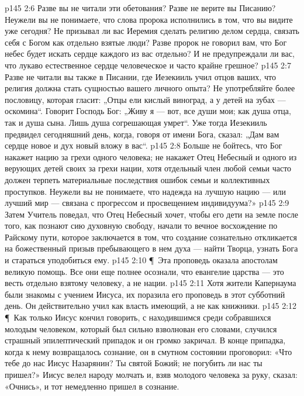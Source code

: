 \vs p145 2:6 Разве вы не читали эти обетования? Разве не верите вы Писанию? Неужели вы не понимаете, что слова пророка исполнились в том, что вы видите уже сегодня? Не призывал ли вас Иеремия сделать религию делом сердца, связать себя с Богом как отдельно взятые люди? Разве пророк не говорил вам, что Бог небес будет искать сердце каждого из вас отдельно? И не предупреждали ли вас, что лукаво естественное сердце человеческое и часто крайне грешное?
\vs p145 2:7 Разве не читали вы также в Писании, где Иезекииль учил отцов ваших, что религия должна стать сущностью вашего личного опыта? Не употребляйте более пословицу, которая гласит: „Отцы ели кислый виноград, а у детей на зубах --- оскомина“. Говорит Господь Бог: „Живу я --- вот, все души мои; как душа отца, так и душа сына. Лишь душа согрешающая умрет“. Уже тогда Иезекииль предвидел сегодняшний день, когда, говоря от имени Бога, сказал: „Дам вам сердце новое и дух новый вложу в вас“.
\vs p145 2:8 Больше не бойтесь, что Бог накажет нацию за грехи одного человека; не накажет Отец Небесный и одного из верующих детей своих за грехи нации, хотя отдельный член любой семьи часто должен терпеть материальные последствия ошибок семьи и коллективных проступков. Неужели вы не понимаете, что надежда на лучшую нацию --- или лучший мир --- связана с прогрессом и просвещением индивидуума?»
\vs p145 2:9 Затем Учитель поведал, что Отец Небесный хочет, чтобы его дети на земле после того, как познают сию духовную свободу, начали то вечное восхождение по Райскому пути, которое заключается в том, что создание сознательно откликается на божественный призыв пребывающего в нем духа --- найти Творца, узнать Бога и стараться уподобиться ему.
\vs p145 2:10 \P\ Эта проповедь оказала апостолам великую помощь. Все они еще полнее осознали, что евангелие царства --- это весть отдельно взятому человеку, а не нации.
\vs p145 2:11 Хотя жители Капернаума были знакомы с учением Иисуса, их поразила его проповедь в этот субботний день. Он действительно учил как власть имеющий, а не как книжники.
\vs p145 2:12 \P\ Как только Иисус кончил говорить, с находившимся среди собравшихся молодым человеком, который был сильно взволнован его словами, случился страшный эпилептический припадок и он громко закричал. В конце припадка, когда к нему возвращалось сознание, он в смутном состоянии проговорил: «Что тебе до нас Иисус Назарянин? Ты святой Божий; не погубить ли нас ты пришел?» Иисус велел народу молчать и, взяв молодого человека за руку, сказал: «Очнись», и тот немедленно пришел в сознание.

